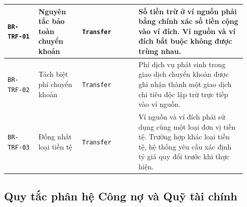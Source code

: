 \documentclass[11pt,a4paper]{article}
\newcommand{\code}[1]{\texttt{#1}}
\newenvironment{smalltable}{\begingroup\footnotesize\renewcommand{\arraystretch}{1.25}\setlength{\tabcolsep}{3pt}}{\endgroup}
\begin{document}
\begin{smalltable}
\begin{longtable}{|L{0.12\linewidth}|L{0.17\linewidth}|L{0.22\linewidth}|L{0.42\linewidth}|}
\code{BR-TRF-01} & Nguyên tắc bảo toàn chuyển khoản & \code{Transfer} & Số tiền trừ ở ví nguồn phải bằng chính xác số tiền cộng vào ví đích. Ví nguồn và ví đích bắt buộc không được trùng nhau. \\ \hline
\code{BR-TRF-02} & Tách biệt phí chuyển khoản & \code{Transfer} & Phí dịch vụ phát sinh trong giao dịch chuyển khoản được ghi nhận thành một giao dịch chi tiêu độc lập trừ trực tiếp vào ví nguồn. \\ \hline
\code{BR-TRF-03} & Đồng nhất loại tiền tệ & \code{Transfer} & Ví nguồn và ví đích phải sử dụng cùng một loại đơn vị tiền tệ. Trường hợp khác loại tiền tệ, hệ thống yêu cầu xác định tỷ giá quy đổi trước khi thực hiện. \\ \hline
\end{longtable}
\end{smalltable}

\subsection{Quy tắc phân hệ Công nợ và Quỹ tài chính}
\end{document}
